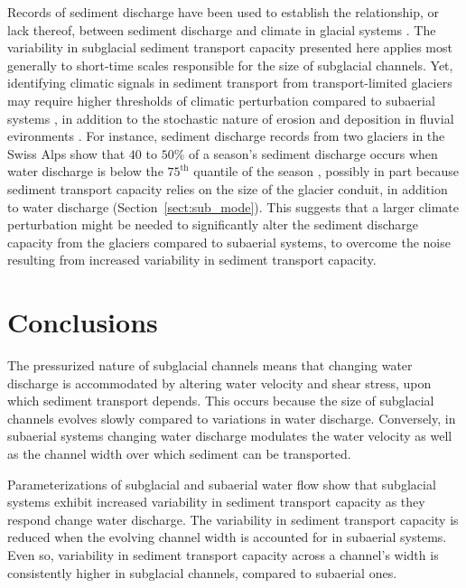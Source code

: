 \documentclass[11pt]{article}
\begin{document}
\begin{spacing}{1}
  Records of sediment discharge have been used to establish the relationship, or lack thereof, between sediment discharge and climate in glacial systems \citep[e.g.][]{koppes2009a,willenbring2016,mariotti2021}.
  The variability in subglacial sediment transport capacity presented here applies most generally to short-time scales responsible for the size of subglacial channels.
  Yet, identifying climatic signals in sediment transport from transport-limited glaciers may require higher thresholds of climatic perturbation compared to subaerial systems \citep{tofelde2021}, in addition to the stochastic nature of erosion and deposition in fluvial evironments \citep{castletort2003,jerolmack2010,romans2016}.
  For instance, sediment discharge records from two glaciers in the Swiss Alps show that $40$ to $50$\% of a season's sediment discharge occurs when water discharge is below the $75^{\mathrm{th}}$ quantile of the season \citep{delaney2018}, possibly in part because sediment transport capacity relies on the size of the glacier conduit, in addition to water discharge (Section~\ref{sect:sub_mode}).
  This suggests that a larger climate perturbation might be needed to significantly alter the sediment discharge capacity from the glaciers compared to subaerial systems, to overcome the noise resulting from increased variability in sediment transport capacity.

  \section{Conclusions}
  
  The pressurized nature of subglacial channels means that changing water discharge is accommodated by altering water velocity and shear stress, upon which sediment transport depends.
  This occurs because the size of subglacial channels evolves slowly compared to variations in water discharge.
  Conversely, in subaerial systems changing water discharge modulates the water velocity as well as the channel width over which sediment can be transported.

  Parameterizations of subglacial and subaerial water flow show that subglacial systems exhibit increased variability in sediment transport capacity as they respond change water discharge.
  The variability in sediment transport capacity is reduced when the evolving channel width is accounted for in subaerial systems.
  Even so, variability in sediment transport capacity across a channel's width is consistently higher in subglacial channels, compared to subaerial ones.
  

\end{spacing}
\end{document}
